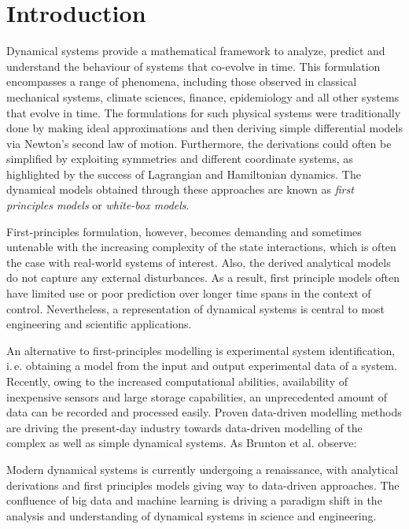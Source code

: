 \section*{Introduction}
\label{Chapter:Intro}
Dynamical systems provide a mathematical framework to analyze, predict and understand the behaviour of systems that co-evolve in time. This formulation encompasses a range of phenomena, including those observed in classical mechanical systems, climate sciences, finance, epidemiology and all other systems that evolve in time. The formulations for such physical systems were traditionally done by making ideal approximations and then deriving simple differential models via Newton's second law of motion. Furthermore, the derivations could often be simplified by exploiting symmetries and different coordinate systems, as highlighted by the success of Lagrangian and Hamiltonian dynamics. The dynamical models obtained through these approaches are known as \textit{first principles models} or \textit{white-box models}.\par
First-principles formulation, however, becomes demanding and sometimes untenable with the increasing complexity of the state interactions, which is often the case with real-world systems of interest. Also, the derived analytical models do not capture any external disturbances. As a result, first principle models often have limited use or poor prediction over longer time spans in the context of control. Nevertheless, a representation of dynamical systems is central to most engineering and scientific applications.\par 
An alternative to first-principles modelling is experimental system identification, i.\,e. obtaining a model from the input and output experimental data of a system. Recently, owing to the increased computational abilities, availability of inexpensive sensors and large storage capabilities, an unprecedented amount of data can be recorded and processed easily. Proven data-driven modelling methods are driving the present-day industry towards data-driven modelling of the complex as well as simple dynamical systems. As Brunton et al. \cite{brunton_kutz_2019} observe:
\begin{displayquote}
Modern dynamical systems is currently undergoing a renaissance, with analytical derivations and first principles models giving way to data-driven approaches. The confluence of big data and machine learning is driving a paradigm shift in the analysis and understanding of dynamical systems in science and engineering. 
\end{displayquote}
% 
% 
